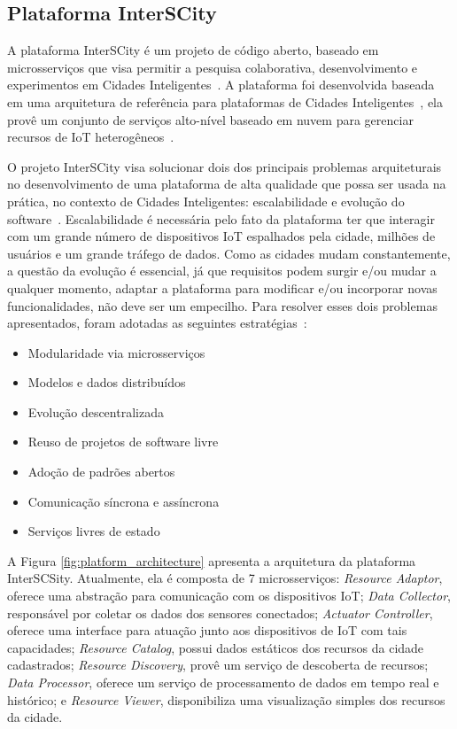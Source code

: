 \subsection{Plataforma InterSCity}
\label{sec:interscity}

A plataforma InterSCity é um projeto de código aberto, baseado em microsserviços que visa permitir a pesquisa colaborativa, desenvolvimento e experimentos em Cidades
Inteligentes~\cite{arthur_17}.
A plataforma foi desenvolvida baseada em uma arquitetura de referência para plataformas de Cidades Inteligentes~\cite{santana_2016}, ela provê um conjunto de serviços
alto-nível baseado em nuvem para gerenciar recursos de IoT heterogêneos~\cite{arthur_17}.

O projeto InterSCity visa solucionar dois dos principais problemas arquiteturais no desenvolvimento de uma plataforma de alta qualidade que possa ser usada na prática, no
contexto de Cidades Inteligentes: escalabilidade e evolução do software~\cite{arthur_17}.
Escalabilidade é necessária pelo fato da plataforma ter que interagir com um grande número de dispositivos IoT espalhados pela cidade, milhões de usuários e
um grande tráfego de dados.
Como as cidades mudam constantemente, a questão da evolução é essencial, já que requisitos podem surgir e/ou mudar a qualquer momento, adaptar a plataforma para modificar e/ou incorporar novas
funcionalidades, não deve ser um empecilho.
Para resolver esses dois problemas apresentados, foram adotadas as seguintes estratégias~\cite{arthur_17}:

\begin{itemize}
	\item Modularidade via microsserviços
	\item Modelos e dados distribuídos
	\item Evolução descentralizada
	\item Reuso de projetos de software livre
	\item Adoção de padrões abertos
	\item Comunicação síncrona e assíncrona
	\item Serviços livres de estado
\end{itemize}

A Figura \ref{fig:platform_architecture} apresenta a arquitetura da plataforma InterSCSity.
Atualmente, ela é composta de 7 microsserviços:
\textit{Resource Adaptor}, oferece uma abstração para comunicação com os dispositivos IoT;
\textit{Data Collector}, responsável por coletar os dados dos sensores conectados;
\textit{Actuator Controller}, oferece uma interface para atuação junto aos dispositivos de IoT com tais capacidades;
\textit{Resource Catalog}, possui dados estáticos dos recursos da cidade cadastrados;
\textit{Resource Discovery}, provê um serviço de descoberta de recursos;
\textit{Data Processor}, oferece um serviço de processamento de dados em tempo real e histórico;
e \textit{Resource Viewer}, disponibiliza uma visualização simples dos recursos da cidade. 

